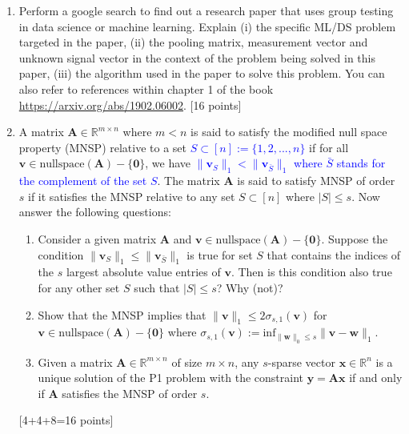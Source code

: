 \documentclass[11pt]{article}
\begin{document}
\begin{enumerate}
\item Perform a google search to find out a research paper that uses group testing in data science or machine learning. Explain (i) the specific ML/DS problem targeted in the paper, (ii) the pooling matrix, measurement vector and unknown signal vector in the context of the problem being solved in this paper, (iii) the algorithm used in the paper to solve this problem. You can also refer to references within chapter 1 of the book \url{https://arxiv.org/abs/1902.06002}. 
\textsf{[16 points]}

\item  A matrix $\boldsymbol{A} \in \mathbb{R}^{m \times n}$ where $m < n$ is said to satisfy the modified null space property (MNSP) relative to a set \textcolor{blue}{$S \subset [n] := \{1,2,...,n\}$} if for all $\boldsymbol{v} \in \textrm{nullspace}(\boldsymbol{A}) - \{\boldsymbol{0}\}$, we have \textcolor{blue}{$\|\boldsymbol{v}_S\|_1 < \|\boldsymbol{v}_{\bar{S}}\|_1$ where $\bar{S}$ stands for the complement of the set $S$}. The matrix $\boldsymbol{A}$ is said to satisfy MNSP of order $s$ if it satisfies the MNSP relative to any set $S \subset [n]$ where $|S| \leq s$. Now answer the following questions:
\begin{enumerate}
\item Consider a given matrix $\boldsymbol{A}$  and $\boldsymbol{v} \in \textrm{nullspace}(\boldsymbol{A}) - \{\boldsymbol{0}\}$. Suppose 
the condition $\|\boldsymbol{v}_S\|_1 \leq \|\boldsymbol{v}_{\bar{S}}\|_1$ is true for set $S$ that contains the indices of the $s$ largest absolute value entries of $\boldsymbol{v}$. Then is this condition also true for any other set $S$ such that $|S| \leq s$? Why (not)?
\item Show that the MNSP implies that $\|\boldsymbol{v}\|_1 \leq 2\sigma_{s,1}(\boldsymbol{v})$ for $\boldsymbol{v}  \in \textrm{nullspace}(\boldsymbol{A}) - \{\boldsymbol{0}\}$ where $\sigma_{s,1}(\boldsymbol{v}) := \textrm{inf}_{\|\boldsymbol{w}\|_0 \leq s} \|\boldsymbol{v} - \boldsymbol{w}\|_1$. 
\item Given a matrix $\boldsymbol{A} \in \mathbb{R}^{m \times n}$ of size $m \times n$, any $s$-sparse vector $\boldsymbol{x} \in \mathbb{R}^n$ is a unique solution of the P1 problem with the constraint $\boldsymbol{y} = \boldsymbol{Ax}$ if and only if $\boldsymbol{A}$ satisfies the MNSP of order $s$. 
\end{enumerate}
\textsf{[4+4+8=16 points]}

\end{enumerate}
\end{document}

